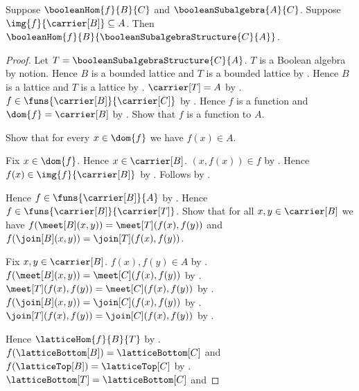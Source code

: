 \begin{theorem}\label{boolean_hom_codomain_corestriction}
    Suppose $\booleanHom{f}{B}{C}$ and
        $\booleanSubalgebra{A}{C}$.
    Suppose $\img{f}{\carrier[B]}\subseteq A$.
    Then
        $\booleanHom{f}{B}{\booleanSubalgebraStructure{C}{A}}$.
\end{theorem}
\begin{proof}
    Let $T=\booleanSubalgebraStructure{C}{A}$.
    $T$ is a Boolean algebra by notion.
    Hence $B$ is a bounded lattice and $T$ is a bounded lattice by
        .
    Hence $B$ is a lattice and $T$ is a lattice by
        .
    $\carrier[T]=A$ by
        .
    $f\in\funs{\carrier[B]}{\carrier[C]}$ by
        .
    Hence $f$ is a function and $\dom{f}=\carrier[B]$ by
        .
    Show that $f$ is a function to $A$.
    \begin{subproof}
        Show that for every $x\in\dom{f}$ we have $f(x)\in A$.
        \begin{subproof}
            Fix $x\in\dom{f}$.
            Hence $x\in\carrier[B]$.
            $(x,f(x))\in f$ by .
            Hence $f(x)\in\img{f}{\carrier[B]}$ by
                .
            Follows by .
        \end{subproof}
    \end{subproof}
    Hence $f\in\funs{\carrier[B]}{A}$ by .
    Hence $f\in\funs{\carrier[B]}{\carrier[T]}$.
    Show that for all $x,y\in\carrier[B]$ we have
        $f(\meet[B](x,y))=\meet[T](f(x),f(y))$ and
        $f(\join[B](x,y))=\join[T](f(x),f(y))$.
    \begin{subproof}
        Fix $x,y\in\carrier[B]$.
        $f(x),f(y)\in A$ by .
        $f(\meet[B](x,y))=\meet[C](f(x),f(y))$ by
            .
        $\meet[T](f(x),f(y))=\meet[C](f(x),f(y))$ by
            .
        $f(\join[B](x,y))=\join[C](f(x),f(y))$ by
            .
        $\join[T](f(x),f(y))=\join[C](f(x),f(y))$ by
            .
    \end{subproof}
    Hence $\latticeHom{f}{B}{T}$ by .
    $f(\latticeBottom[B])=\latticeBottom[C]$ and
        $f(\latticeTop[B])=\latticeTop[C]$ by
        .
    $\latticeBottom[T]=\latticeBottom[C]$ and

\end{proof}

